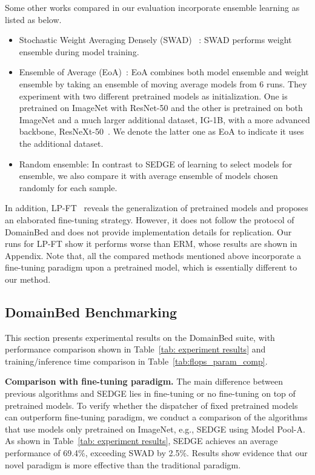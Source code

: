 \documentclass{article}
\newcommand{\method}{\textsc{SEDGE}\xspace}
\begin{document}
Some other works compared in our evaluation incorporate ensemble learning as listed as below.
\begin{itemize}
    \item [] 
    Stochastic Weight Averaging Densely (SWAD) ~\citep{cha2021swad}: SWAD performs weight ensemble during model training.
    \item [] 
    Ensemble of Average (EoA)~\citep{arpit2021ensemble}: 
    EoA combines both model ensemble and weight ensemble by taking an ensemble of moving average models from 6 runs. 
    They experiment with two different pretrained models as initialization.
    One is pretrained on ImageNet with ResNet-50 and the other is pretrained on both ImageNet and a much larger additional dataset, IG-1B, with a more advanced backbone, ResNeXt-50~\citep{xie2017aggregated}.
    We denote the latter one as EoA to indicate it uses the additional dataset.
    \item []
    Random ensemble: In contrast to \method of learning to select models for ensemble, we also compare it with average ensemble of  models chosen randomly for each sample.
\end{itemize}
In addition, LP-FT~\citep{kumar2021fine} reveals the generalization of pretrained models and proposes an elaborated fine-tuning strategy. 
However, it does not follow the protocol of DomainBed and does not provide implementation details for replication. 
Our runs for LP-FT show it performs worse than ERM, whose results are shown in Appendix.
Note that, all the compared methods mentioned above incorporate a fine-tuning paradigm upon a pretrained model, which is essentially different to our method.



\subsection{DomainBed Benchmarking}


This section presents experimental results on the DomainBed suite, with performance comparison shown in Table~\ref{tab: experiment results} and training/inference time comparison in Table~\ref{tab:flops_param_comp}.


\textbf{Comparison with fine-tuning paradigm.}
The main difference between previous algorithms and \method lies in fine-tuning or no fine-tuning on top of pretrained models.
To verify whether the dispatcher of fixed pretrained models can outperform fine-tuning paradigm, we conduct a comparison of the algorithms that use models only pretrained on ImageNet, e.g., \method using Model Pool-A.
As shown in Table~\ref{tab: experiment results}, \method achieves an average performance of 69.4\%, exceeding SWAD by 2.5\%. 
Results show evidence that our novel paradigm is more effective than the traditional paradigm.
\end{document}
